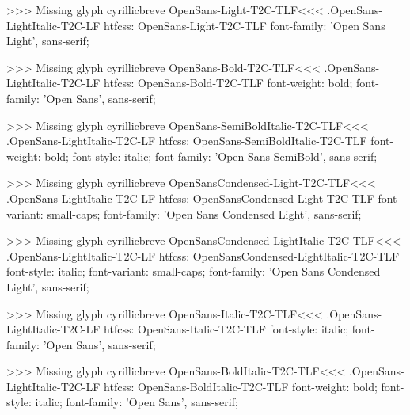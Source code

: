 >>>
Missing glyph	cyrillicbreve
\<OpenSans-Light-T2C-TLF\><<<
.OpenSans-LightItalic-T2C-LF
htfcss:  OpenSans-Light-T2C-TLF  font-family: 'Open Sans Light', sans-serif;

>>>
Missing glyph	cyrillicbreve
\<OpenSans-Bold-T2C-TLF\><<<
.OpenSans-LightItalic-T2C-LF
htfcss:  OpenSans-Bold-T2C-TLF  font-weight: bold; font-family: 'Open Sans', sans-serif;

>>>
Missing glyph	cyrillicbreve
\<OpenSans-SemiBoldItalic-T2C-TLF\><<<
.OpenSans-LightItalic-T2C-LF
htfcss:  OpenSans-SemiBoldItalic-T2C-TLF  font-weight: bold; font-style: italic; font-family: 'Open Sans SemiBold', sans-serif;

>>>
Missing glyph	cyrillicbreve
\<OpenSansCondensed-Light-T2C-TLF\><<<
.OpenSans-LightItalic-T2C-LF
htfcss:  OpenSansCondensed-Light-T2C-TLF  font-variant: small-caps; font-family: 'Open Sans Condensed Light', sans-serif;

>>>
Missing glyph	cyrillicbreve
\<OpenSansCondensed-LightItalic-T2C-TLF\><<<
.OpenSans-LightItalic-T2C-LF
htfcss:  OpenSansCondensed-LightItalic-T2C-TLF  font-style: italic; font-variant: small-caps; font-family: 'Open Sans Condensed Light', sans-serif;

>>>
Missing glyph	cyrillicbreve
\<OpenSans-Italic-T2C-TLF\><<<
.OpenSans-LightItalic-T2C-LF
htfcss:  OpenSans-Italic-T2C-TLF  font-style: italic; font-family: 'Open Sans', sans-serif;

>>>
Missing glyph	cyrillicbreve
\<OpenSans-BoldItalic-T2C-TLF\><<<
.OpenSans-LightItalic-T2C-LF
htfcss:  OpenSans-BoldItalic-T2C-TLF  font-weight: bold; font-style: italic; font-family: 'Open Sans', sans-serif;

